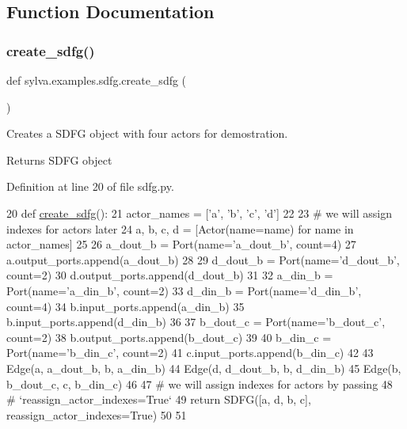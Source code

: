 \subsection{Function Documentation}
\mbox{\label{namespacesylva_1_1examples_1_1sdfg_ad4206a7c163d26bbbe8173a5f3dc9000}} 
\subsubsection{\texorpdfstring{create\+\_\+sdfg()}{create\_sdfg()}}
{\footnotesize\ttfamily def sylva.\+examples.\+sdfg.\+create\+\_\+sdfg (\begin{DoxyParamCaption}{ }\end{DoxyParamCaption})}



Creates a S\+D\+FG object with four actors for demostration. 

\begin{DoxyReturn}{Returns}
S\+D\+FG object 
\end{DoxyReturn}


Definition at line 20 of file sdfg.\+py.


\begin{DoxyCode}
20 \textcolor{keyword}{def }\hyperlink{namespacesylva_1_1examples_1_1sdfg_ad4206a7c163d26bbbe8173a5f3dc9000}{create\_sdfg}():
21     actor\_names = [\textcolor{stringliteral}{'a'}, \textcolor{stringliteral}{'b'}, \textcolor{stringliteral}{'c'}, \textcolor{stringliteral}{'d'}]
22 
23     \textcolor{comment}{# we will assign indexes for actors later}
24     a, b, c, d = [Actor(name=name) \textcolor{keywordflow}{for} name \textcolor{keywordflow}{in} actor\_names]
25 
26     a\_dout\_b = Port(name=\textcolor{stringliteral}{'a\_dout\_b'}, count=4)
27     a.output\_ports.append(a\_dout\_b)
28 
29     d\_dout\_b = Port(name=\textcolor{stringliteral}{'d\_dout\_b'}, count=2)
30     d.output\_ports.append(d\_dout\_b)
31 
32     a\_din\_b = Port(name=\textcolor{stringliteral}{'a\_din\_b'}, count=2)
33     d\_din\_b = Port(name=\textcolor{stringliteral}{'d\_din\_b'}, count=4)
34     b.input\_ports.append(a\_din\_b)
35     b.input\_ports.append(d\_din\_b)
36 
37     b\_dout\_c = Port(name=\textcolor{stringliteral}{'b\_dout\_c'}, count=2)
38     b.output\_ports.append(b\_dout\_c)
39 
40     b\_din\_c = Port(name=\textcolor{stringliteral}{'b\_din\_c'}, count=2)
41     c.input\_ports.append(b\_din\_c)
42 
43     Edge(a, a\_dout\_b, b, a\_din\_b)
44     Edge(d, d\_dout\_b, b, d\_din\_b)
45     Edge(b, b\_dout\_c, c, b\_din\_c)
46 
47     \textcolor{comment}{# we will assign indexes for actors by passing}
48     \textcolor{comment}{# `reassign\_actor\_indexes=True`}
49     \textcolor{keywordflow}{return} SDFG([a, d, b, c], reassign\_actor\_indexes=\textcolor{keyword}{True})
50 
51 
\end{DoxyCode}


